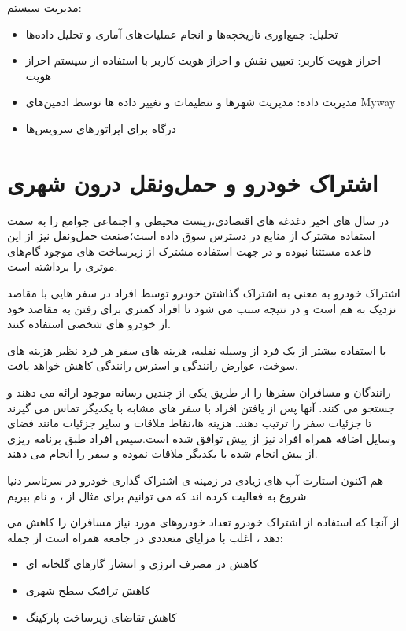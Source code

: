 مدیریت سیستم:
\begin{itemize}
\item
تحلیل: جمع‌اوری تاریخچه‌ها و انجام عملیات‌های آماری و تحلیل داده‌ها 
\item
احراز هویت کاربر: تعیین نقش و احراز هویت کاربر با استفاده از سیستم احراز هویت
\item 
مدیریت داده: مدیریت شهر‌ها و تنظیمات و تغییر داده ها توسط ادمین‌های Myway
\item 
درگاه برای اپراتور‌های سرویس‌ها
\end{itemize}


\section{اشتراک خودرو و حمل‌و‌نقل درون شهری}
در سال های اخیر دغدغه های اقتصادی،‌زیست محیطی و اجتماعی جوامع را به سمت استفاده مشترک از منابع در دسترس سوق داده است؛صنعت حمل‌و‌نقل نیز از این قاعده مستثنا نبوده و در جهت استفاده مشترک از زیرساخت های موجود گام‌های موثری را برداشته است.

اشتراک خودرو به معنی به اشتراک گذاشتن خودرو توسط افراد در سفر هایی با مقاصد نزدیک به هم است و در نتیجه سبب می شود تا افراد کمتری برای رفتن به مقاصد خود از خودرو های شخصی استفاده کنند.

با استفاده بیشتر از یک فرد از وسیله نقلیه، هزینه های سفر هر فرد نظیر  هزینه های سوخت، عوارض رانندگی و استرس رانندگی کاهش خواهد یافت.

رانندگان و مسافران سفرها را از طریق یکی از چندین رسانه موجود ارائه می دهند و جستجو می کنند. آنها پس از یافتن افراد با سفر های مشابه با یکدیگر تماس می گیرند تا جزئیات سفر را ترتیب دهند. هزینه ها،‌نقاط ملاقات و سایر جزئیات مانند فضای وسایل اضافه همراه افراد نیز از پیش توافق شده است.‌‌سپس افراد طبق برنامه ریزی از پیش انجام شده با یکدیگر ملاقات نموده و سفر را انجام می دهند.

هم اکنون استارت آپ های زیادی در زمینه ی اشتراک گذاری خودرو در سرتاسر دنیا شروع به فعالیت کرده اند که می توانیم برای مثال از  ،  و  نام ببریم.

از آنجا که استفاده از اشتراک خودرو تعداد خودر‌و‌های مورد نیاز مسافران را کاهش می دهد ، اغلب با مزایای متعددی در جامعه همراه است از جمله: 
\begin{itemize}
\item
کاهش در مصرف انرژی و انتشار گازهای گلخانه ای
\item
کاهش ترافیک سطح شهری
\item
کاهش تقاضای زیرساخت پارکینگ
\end{itemize}
